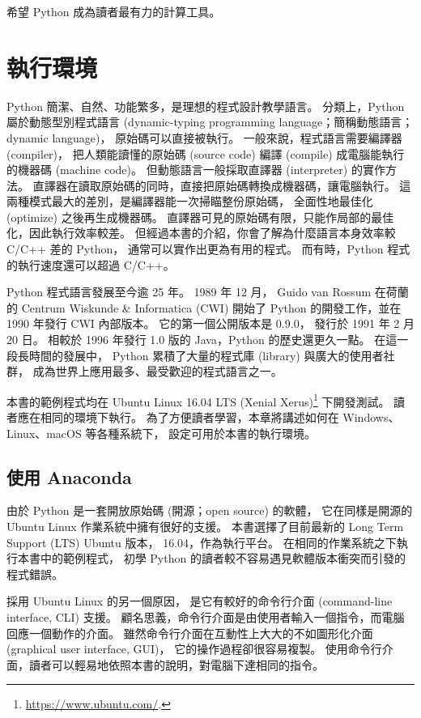 \documentclass[a4paper,12pt]{book}
\theoremstyle{definition}
\begin{document}
希望 Python 成為讀者最有力的計算工具。

\mainmatter

\chapter{執行環境}
%
\label{c:runtime}

Python 簡潔、自然、功能繁多，是理想的程式設計教學語言。
分類上，Python 屬於動態型別程式語言
(dynamic-typing programming language；簡稱動態語言；dynamic language)，
原始碼可以直接被執行。
一般來說，程式語言需要編譯器 (compiler)，
把人類能讀懂的原始碼 (source code)
編譯 (compile) 成電腦能執行的機器碼 (machine code)。
但動態語言一般採取直譯器 (interpreter) 的實作方法。
直譯器在讀取原始碼的同時，直接把原始碼轉換成機器碼，讓電腦執行。
這兩種模式最大的差別，是編譯器能一次掃瞄整份原始碼，
全面性地最佳化 (optimize) 之後再生成機器碼。
直譯器可見的原始碼有限，只能作局部的最佳化，因此執行效率較差。
但經過本書的介紹，你會了解為什麼語言本身效率較 C/C++ 差的 Python，
通常可以實作出更為有用的程式。
而有時，Python 程式的執行速度還可以超過 C/C++。

Python 程式語言發展至今逾 25 年。
1989 年 12 月，
Guido van Rossum 在荷蘭的 Centrum Wiskunde \& Informatica (CWI) 開始了
Python 的開發工作，並在 1990 年發行 CWI 內部版本。
它的第一個公開版本是 0.9.0，
發行於 1991 年 2 月 20 日\cite{rossum_brief_2009}。
相較於 1996 年發行 1.0 版的 Java，Python 的歷史還更久一點。
在這一段長時間的發展中，
Python 累積了大量的程式庫 (library) 與廣大的使用者社群，
成為世界上應用最多、最受歡迎的程式語言之一。

本書的範例程式均在 Ubuntu Linux 16.04 LTS (Xenial Xerus)\footnote{\url{https://www.ubuntu.com/}.}
下開發測試。
讀者應在相同的環境下執行。
為了方便讀者學習，本章將講述如何在 Windows、Linux、macOS 等各種系統下，
設定可用於本書的執行環境。

\section{使用 Anaconda}
%
\label{c:runtime:anaconda}

由於 Python 是一套開放原始碼 (開源；open source) 的軟體，
它在同樣是開源的 Ubuntu Linux 作業系統中擁有很好的支援。
本書選擇了目前最新的 Long Term Support (LTS) Ubuntu 版本，
16.04，作為執行平台。
在相同的作業系統之下執行本書中的範例程式，
初學 Python 的讀者較不容易遇見軟體版本衝突而引發的程式錯誤。

採用 Ubuntu Linux 的另一個原因，
是它有較好的命令行介面 (command-line interface, CLI) 支援。
顧名思義，命令行介面是由使用者輸入一個指令，而電腦回應一個動作的介面。
雖然命令行介面在互動性上大大的不如圖形化介面 (graphical user interface, GUI)，
它的操作過程卻很容易複製。
使用命令行介面，讀者可以輕易地依照本書的說明，對電腦下達相同的指令。
\end{document}
